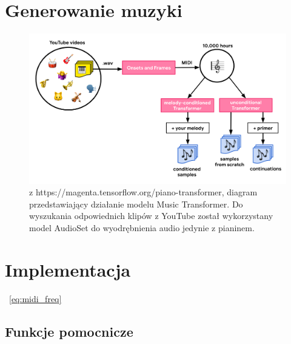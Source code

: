\documentclass[12pt,a4paper,twoside]{mwart}
\begin{document}
\section{Generowanie muzyki}
\begin{figure}[H]
  \begin{center}
    \includegraphics[scale=0.25]{images/pianoTransformerDiagram.png}
    \caption{z https://magenta.tensorflow.org/piano-transformer, diagram przedstawiający działanie modelu Music Transformer. Do wyszukania odpowiednich klipów z YouTube został wykorzystany model AudioSet \cite{audioSet} do wyodrębnienia audio jedynie z pianinem.}
  \end{center}
\end{figure}

\cite{DBLP:journals/corr/abs-1809-04281}\cite{DBLP:journals/corr/VaswaniSPUJGKP17}
\cite{DBLP:journals/corr/HuangW16}
\cite{DBLP:journals/corr/abs-1810-12247}
\newpage

\section{Implementacja}
\label{sec:implementacja}
~\ref{eq:midi_freq}
\subsection{Funkcje pomocnicze}
\newpage
\end{document}
